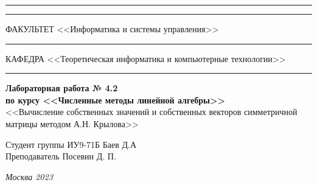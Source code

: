 \documentclass[a4paper, 14pt]{extarticle}
\begin{document}
\begin{titlepage}
\vspace{-25pt}
\hspace{-35pt}\rule{\textwidth}{2.3pt}

\vspace*{-20.3pt}
\hspace{-35pt}\rule{\textwidth}{0.4pt}

\vspace{1.5ex}
\hspace{-35pt} \noindent \small ФАКУЛЬТЕТ\hspace{80pt} <<Информатика и системы управления>>

\vspace*{-16pt}
\hspace{47pt}\rule{0.83\textwidth}{0.4pt}

\vspace{0.5ex}
\hspace{-35pt} \noindent \small КАФЕДРА\hspace{50pt} <<Теоретическая информатика и компьютерные технологии>>

\vspace*{-16pt}
\hspace{30pt}\rule{0.866\textwidth}{0.4pt}

\vspace{11em}

\begin{center}
\Large {\bf Лабораторная работа № 4.2} \\
\large {\bf по курсу <<Численные методы линейной алгебры>>} \\
\large <<Вычисление собственных значений и собственных
векторов симметричной матрицы методом А.Н. Крылова>>
\end{center}\normalsize

\vspace{8em}


\begin{flushright}
  {Студент группы ИУ9-71Б Баев Д.А \hspace*{15pt}\\
  \vspace{2ex}
  Преподаватель Посевин Д. П.\hspace*{15pt}}
\end{flushright}

\bigskip

\vfill


\begin{center}
\textsl{Москва 2023}
\end{center}
\end{titlepage}
\end{document}
